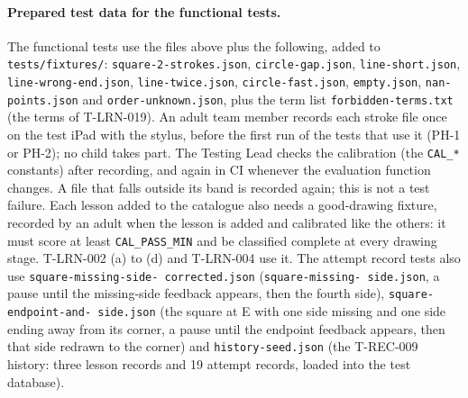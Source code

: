 \documentclass[12pt, titlepage]{article}
\begin{document}
\paragraph{Prepared test data for the functional tests.} The functional
tests use the files above plus the following, added to
\texttt{tests/fixtures/}:
\texttt{square-\allowbreak{}2-\allowbreak{}strokes.json},
\texttt{circle-\allowbreak{}gap.json},
\texttt{line-\allowbreak{}short.json},
\texttt{line-\allowbreak{}wrong-\allowbreak{}end.json},
\texttt{line-\allowbreak{}twice.json},
\texttt{circle-\allowbreak{}fast.json}, \texttt{empty.json},
\texttt{nan-\allowbreak{}points.json} and
\texttt{order-\allowbreak{}unknown.json}, plus the term list
\texttt{forbidden-\allowbreak{}terms.txt} (the terms of T-LRN-019). An
adult team member records each stroke file once on the test iPad with the
stylus, before the first run of the tests that use it (PH-1 or PH-2); no
child takes part. The Testing Lead checks the calibration (the
\texttt{CAL\_*} constants) after recording, and again in CI whenever the
evaluation function changes. A file that falls outside its band is recorded
again; this is not a test failure. Each lesson added to the catalogue also
needs a good-drawing fixture, recorded by an adult when the lesson is added
and calibrated like the others: it must score at least
\texttt{CAL\_PASS\_MIN} and be classified complete at every drawing stage.
T-LRN-002 (a) to (d) and T-LRN-004 use it. The attempt record tests also use
\texttt{square-\allowbreak{}missing-\allowbreak{}side-\allowbreak{}%
corrected.json} (\texttt{square-\allowbreak{}missing-\allowbreak{}%
side.json}, a pause until the missing-side feedback appears, then the
fourth side), \texttt{square-\allowbreak{}endpoint-\allowbreak{}and-%
\allowbreak{}side.json} (the square at E with one side missing and one side
ending away from its corner, a pause until the endpoint feedback appears,
then that side redrawn to the corner) and
\texttt{history-\allowbreak{}seed.json} (the T-REC-009 history: three
lesson records and 19 attempt records, loaded into the test database).
\end{document}
